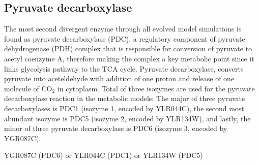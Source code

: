 \subsection{Pyruvate decarboxylase}
The most second divergent enzyme through all evolved model simulations is found as pyruvate decarboxylase (PDC), a regulatory component of pyruvate dehydrogenase (PDH) complex that is responsible for conversion of pyruvate to acetyl coenzyme A, therefore making the complex a key metabolic point since it links glycolysis pathway to the TCA cycle. Pyruvate decarboxylase, converts pyruvate into aceteldehyde with addition of one proton and release of one molecule of CO$_2$ in cytoplasm. Total of three isozymes are used for the pyruvate decarboxylase reaction in the metabolic models: The major of three pyruvate decarboxylases is PDC1 (isozyme 1, encoded by YLR044C), the second most abundant isozyme is PDC5 (isozyme 2, encoded by YLR134W), and lastly, the minor of three pyruvate decarboxylase is PDC6 (isozyme 3, encoded by YGR087C).




YGR087C (PDC6) or YLR044C (PDC1) or YLR134W (PDC5)

